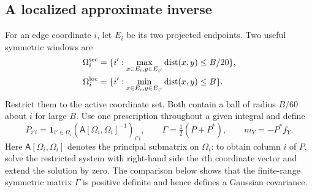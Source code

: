 \subsection{A localized approximate inverse}

For an edge coordinate $i$, let $E_i$ be its two projected endpoints.
Two useful symmetric windows are
\begin{align*}
 \Omega_i^{\rm sec}&=\{i':\max_{x\in E_i,y\in E_{i'}}
                                      \operatorname{dist}(x,y)\le B/20\},\\
 \Omega_i^{\rm loc}&=\{i':\min_{x\in E_i,y\in E_{i'}}
                                      \operatorname{dist}(x,y)\le B\}.
\end{align*}
Restrict them to the active coordinate set. Both contain a ball of radius
$B/60$ about $i$ for large $B$. Use one prescription throughout a given
integral and define
\begin{equation}
 P_{i'i}=\mathbf1_{i'\in\Omega_i}
                    (\mathsf A[\Omega_i,\Omega_i]^{-1})_{i'i},
 \qquad \Gamma=\tfrac12(P+P^*),\qquad m_Y=-P^*f_Y.
 \label{ch06:windows-def}
\end{equation}
Here $\mathsf A[\Omega_i,\Omega_i]$ denotes the principal submatrix on
$\Omega_i$: to obtain column $i$ of $P$, solve the restricted system with
right-hand side the $i$th coordinate vector and extend the solution by
zero. The comparison below shows that the finite-range symmetric matrix
$\Gamma$ is positive definite and hence defines a Gaussian covariance.


